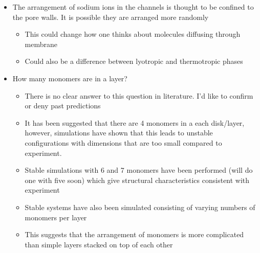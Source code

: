 \documentclass{article}
\begin{document}
	\begin{itemize}
		\item The arrangement of sodium ions in the channels is thought to be confined to the pore walls. It is possible they are arranged more randomly
		\begin{itemize}
			\item This could change how one thinks about molecules diffusing through membrane
			\item Could also be a difference between lyotropic and thermotropic phases
		\end{itemize}
		\item How many monomers are in a layer?
		\begin{itemize}
			\item There is no clear answer to this question in literature. I'd like to confirm or deny past predictions
			\item It has been suggested that there are 4 monomers in a each disk/layer, however, simulations have shown that this leads to unstable configurations with dimensions that are too small compared to experiment.
			\item Stable simulations with 6 and 7 monomers have been performed (will do one with five soon) which give structural characteristics consistent with experiment
			\item Stable systems have also been simulated consisting of varying numbers of monomers per layer
			\item This suggests that the arrangement of monomers is more complicated than simple layers stacked on top of each other
		\end{itemize}
	\end{itemize}
	
\end{document}
